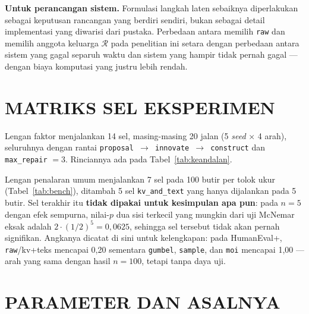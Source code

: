 \documentclass{laporanta1statugm}
\newcommand{\code}[1]{\texttt{#1}}
\begin{document}
\textbf{Untuk perancangan sistem.} Formulasi langkah laten sebaiknya
diperlakukan sebagai keputusan rancangan yang berdiri sendiri, bukan sebagai
detail implementasi yang diwarisi dari pustaka. Perbedaan antara memilih
\code{raw} dan memilih anggota keluarga $\mathcal{R}$ pada penelitian ini
setara dengan perbedaan antara sistem yang gagal separuh waktu dan sistem yang
hampir tidak pernah gagal --- dengan biaya komputasi yang justru lebih rendah.



\appendix
\renewcommand{\thesection}{\thechapter.\arabic{section}.}
\renewcommand{\thesubsection}{\thechapter.\arabic{section}.\arabic{subsection}.}
\renewcommand{\thetable}{\thechapter.\arabic{table}}
\renewcommand{\thefigure}{\thechapter.\arabic{figure}}

\chapter{MATRIKS SEL EKSPERIMEN}

Lengan faktor menjalankan 14 sel, masing-masing 20 jalan (5 \textit{seed}
$\times$ 4 arah), seluruhnya dengan rantai
\code{proposal $\to$ innovate $\to$ construct} dan \code{max\_repair} $= 3$.
Rinciannya ada pada Tabel~\ref{tab:keandalan}.

Lengan penalaran umum menjalankan 7 sel pada 100 butir per tolok ukur
(Tabel~\ref{tab:bench}), ditambah 5 sel \code{kv\_and\_text} yang hanya
dijalankan pada 5 butir. Sel terakhir itu \textbf{tidak dipakai untuk
kesimpulan apa pun}: pada $n = 5$ dengan efek sempurna, nilai-$p$ dua sisi
terkecil yang mungkin dari uji McNemar eksak adalah $2\cdot(1/2)^{5} = 0{,}0625$,
sehingga sel tersebut tidak akan pernah signifikan. Angkanya dicatat di sini
untuk kelengkapan: pada HumanEval+, \code{raw}/kv+teks mencapai 0,20 sementara
\code{gumbel}, \code{sample}, dan \code{moi} mencapai 1,00 --- arah yang sama
dengan hasil $n = 100$, tetapi tanpa daya uji.

\chapter{PARAMETER DAN ASALNYA}
\end{document}
